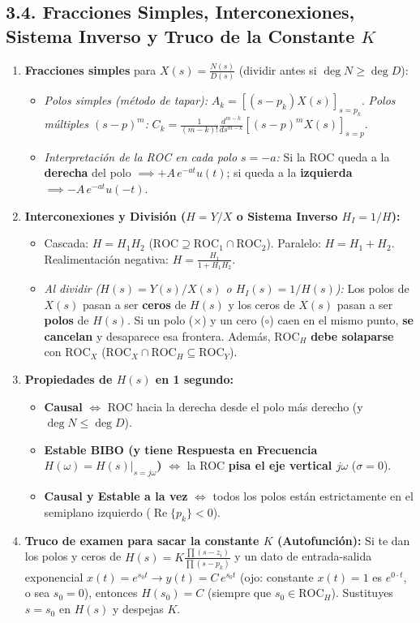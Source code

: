 \documentclass[10pt,a4paper]{article}
\begin{document}
	\subsection*{3.4. Fracciones Simples, Interconexiones, Sistema Inverso y Truco de la Constante $K$}
	\begin{enumerate}
		\item \textbf{Fracciones simples} para $X(s) = \frac{N(s)}{D(s)}$ (dividir antes si $\deg N \ge \deg D$):
		\begin{itemize}
			\item \emph{Polos simples (método de tapar):} $A_k = \left[(s-p_k)X(s)\right]_{s=p_k}$. \quad \emph{Polos múltiples $(s-p)^m$:} $C_k = \frac{1}{(m-k)!}\frac{d^{m-k}}{ds^{m-k}}\left[(s-p)^m X(s)\right]_{s=p}$.
			\item \emph{Interpretación de la ROC en cada polo $s=-a$:} Si la ROC queda a la \textbf{derecha} del polo $\implies +A\,e^{-at}u(t)$; si queda a la \textbf{izquierda} $\implies -A\,e^{-at}u(-t)$.
		\end{itemize}
		\item \textbf{Interconexiones y División ($H = Y/X$ o Sistema Inverso $H_I = 1/H$):}
		\begin{itemize}
			\item Cascada: $H = H_1 H_2$ ($\text{ROC} \supseteq \text{ROC}_1 \cap \text{ROC}_2$). \quad Paralelo: $H = H_1 + H_2$. \quad Realimentación negativa: $H = \frac{H_1}{1 + H_1 H_2}$.
			\item \emph{Al dividir ($H(s) = Y(s)/X(s)$ o $H_I(s) = 1/H(s)$):} Los polos de $X(s)$ pasan a ser \textbf{ceros} de $H(s)$ y los ceros de $X(s)$ pasan a ser \textbf{polos} de $H(s)$. Si un polo ($\times$) y un cero ($\circ$) caen en el mismo punto, \textbf{se cancelan} y desaparece esa frontera. Además, $\text{ROC}_H$ \textbf{debe solaparse} con $\text{ROC}_X$ ($\text{ROC}_X \cap \text{ROC}_H \subseteq \text{ROC}_Y$).
		\end{itemize}
		\item \textbf{Propiedades de $H(s)$ en 1 segundo:}
		\begin{itemize}
			\item \textbf{Causal} $\iff$ ROC hacia la derecha desde el polo más derecho (y $\deg N \le \deg D$).
			\item \textbf{Estable BIBO (y tiene Respuesta en Frecuencia $H(\omega)=H(s)|_{s=j\omega}$)} $\iff$ la ROC \textbf{pisa el eje vertical $j\omega$} ($\sigma = 0$).
			\item \textbf{Causal y Estable a la vez} $\iff$ todos los polos están estrictamente en el semiplano izquierdo ($\operatorname{Re}\{p_k\} < 0$).
		\end{itemize}
		\item \textbf{Truco de examen para sacar la constante $K$ (Autofunción):} Si te dan los polos y ceros de $H(s) = K\frac{\prod(s-z_i)}{\prod(s-p_k)}$ y un dato de entrada-salida exponencial $x(t) = e^{s_0 t} \to y(t) = C\,e^{s_0 t}$ (ojo: constante $x(t)=1$ es $e^{0\cdot t}$, o sea $s_0 = 0$), entonces \textbf{$H(s_0) = C$} (siempre que $s_0 \in \text{ROC}_H$). Sustituyes $s = s_0$ en $H(s)$ y despejas $K$.
	\end{enumerate}
	
\end{document}
